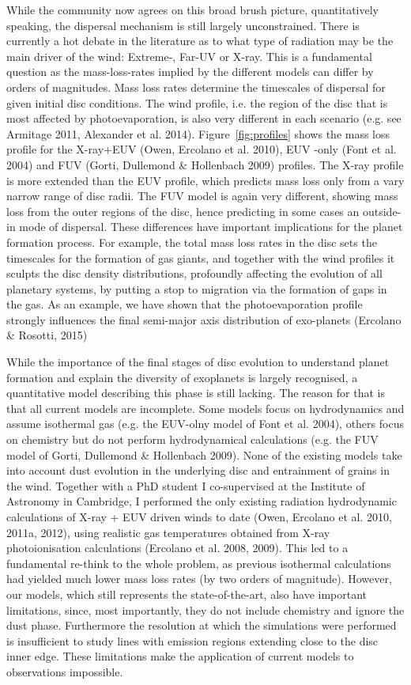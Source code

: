 \documentclass[10pt,fleqn,twoside]{article}
\begin{document}
While the community now agrees on this broad brush picture,
quantitatively speaking, the dispersal mechanism is still largely
unconstrained. There is currently a hot debate in the literature as to
what type of radiation may be the main driver of the wind: Extreme-,
Far-UV or X-ray. This is a fundamental question as the mass-loss-rates
implied by the different models can differ by orders of
magnitudes. Mass loss rates determine the timescales of dispersal for
given initial disc conditions. The wind profile, i.e. the region of
the disc that is most affected by photoevaporation, is also very
different in each scenario (e.g. see Armitage 2011, Alexander et
al. 2014). Figure~\ref{fig:profiles} shows the mass loss profile for the X-ray+EUV
(Owen, Ercolano et al. 2010), EUV -only (Font et al. 2004) and FUV
(Gorti, Dullemond \& Hollenbach 2009) profiles. The X-ray profile is
more extended than the EUV profile, which predicts mass loss only from
a vary narrow range of disc radii. The FUV model is again very
different, showing mass loss from the outer regions of the disc, hence
predicting in some cases an outside-in mode of dispersal. These
differences have important implications for the planet formation
process. For example, the total
mass loss rates in the disc sets the timescales for the formation of
gas giants, and together with the wind
profiles it sculpts the disc density distributions, profoundly affecting
the evolution of all planetary systems, by putting a stop to migration via
the formation of gaps in the gas. As an example, we have shown that
the photoevaporation profile strongly influences the final semi-major
axis distribution of exo-planets (Ercolano \& Rosotti, 2015) 

While the importance of the final stages
of disc evolution to understand planet formation and explain the
diversity of exoplanets is largely recognised, a quantitative model describing this phase is
still lacking. The reason for that is that all current models are
incomplete. Some models focus on hydrodynamics and 
assume isothermal gas (e.g. the EUV-olny model of Font et al. 2004), others focus on
chemistry but do not perform hydrodynamical calculations (e.g. the FUV
model of Gorti,
Dullemond \& Hollenbach 2009). None of the existing models take into
account dust evolution in the underlying disc and entrainment of
grains in the wind. Together with a PhD student I co-supervised
at the Institute of Astronomy in Cambridge, I performed
the only existing radiation hydrodynamic calculations of X-ray  + EUV driven
winds to date (Owen, Ercolano et al. 2010, 2011a, 2012), using realistic gas
temperatures obtained from X-ray photoionisation calculations
(Ercolano et al. 2008, 2009). This led to a fundamental re-think to the
whole problem, as previous isothermal calculations had yielded much
lower mass loss rates (by two orders of magnitude). However, our
models, which still represents the state-of-the-art, also have
important limitations, since, most importantly, they do not include
chemistry and ignore the dust phase. Furthermore the resolution at
which the simulations were performed is insufficient to study lines with
emission regions extending close to the disc inner edge. These
limitations make the application of current models to observations
impossible.  
\end{document}
